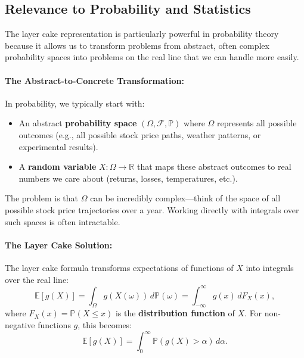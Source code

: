\documentclass[11pt]{amsart}
\begin{document}
\subsection*{Relevance to Probability and Statistics}

The layer cake representation is particularly powerful in probability theory because it allows us to transform problems from abstract, often complex probability spaces into problems on the real line that we can handle more easily.

\paragraph{The Abstract-to-Concrete Transformation:}
In probability, we typically start with:
\begin{itemize}
	\item An abstract \textbf{probability space} $(\Omega, \mathcal{F}, \mathbb{P})$ where $\Omega$ represents all possible outcomes (e.g., all possible stock price paths, weather patterns, or experimental results).
	\item A \textbf{random variable} $X: \Omega \to \mathbb{R}$ that maps these abstract outcomes to real numbers we care about (returns, losses, temperatures, etc.).
\end{itemize}

The problem is that $\Omega$ can be incredibly complex—think of the space of all possible stock price trajectories over a year. Working directly with integrals over such spaces is often intractable.

\paragraph{The Layer Cake Solution:}
The layer cake formula transforms expectations of functions of $X$ into integrals over the real line:
\[
	\mathbb{E}[g(X)] = \int_\Omega g(X(\omega)) \, d\mathbb{P}(\omega) = \int_{-\infty}^\infty g(x) \, dF_X(x),
\]
where $F_X(x) = \mathbb{P}(X \leq x)$ is the \textbf{distribution function} of $X$. For non-negative functions $g$, this becomes:
\[
	\mathbb{E}[g(X)] = \int_0^\infty \mathbb{P}(g(X) > \alpha) \, d\alpha.
\]
\end{document}
